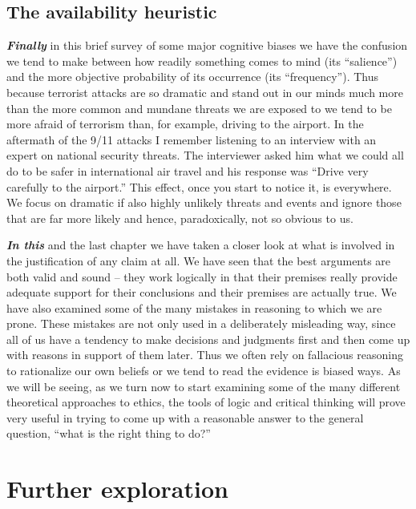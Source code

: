 \documentclass[12pt, openany]{book}
\begin{document}
\hypertarget{the-availability-heuristic}{%
\subsection*{The availability heuristic}\label{the-availability-heuristic}}


\textbf{\emph{Finally}} in this brief survey of some major cognitive biases we have the confusion we tend to make between how readily something comes to mind (its ``salience'') and the more objective probability of its occurrence (its ``frequency''). Thus because terrorist attacks are so dramatic and stand out in our minds much more than the more common and mundane threats we are exposed to we tend to be more afraid of terrorism than, for example, driving to the airport. In the aftermath of the 9/11 attacks I remember listening to an interview with an expert on national security threats. The interviewer asked him what we could all do to be safer in international air travel and his response was ``Drive very carefully to the airport.'' This effect, once you start to notice it, is everywhere. We focus on dramatic if also highly unlikely threats and events and ignore those that are far more likely and hence, paradoxically, not so obvious to us.

\textbf{\emph{In this}} and the last chapter we have taken a closer look at what is involved in the justification of any claim at all. We have seen that the best arguments are both valid and sound -- they work logically in that their premises really provide adequate support for their conclusions and their premises are actually true. We have also examined some of the many mistakes in reasoning to which we are prone. These mistakes are not only used in a deliberately misleading way, since all of us have a tendency to make decisions and judgments first and then come up with reasons in support of them later. Thus we often rely on fallacious reasoning to rationalize our own beliefs or we tend to read the evidence is biased ways. As we will be seeing, as we turn now to start examining some of the many different theoretical approaches to ethics, the tools of logic and critical thinking will prove very useful in trying to come up with a reasonable answer to the general question, ``what is the right thing to do?''

\hypertarget{further-3}{%
\section*{Further exploration}\label{further-3}}
\end{document}
